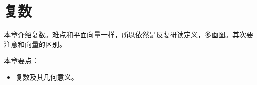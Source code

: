 \chapter{复数}

本章介绍复数。难点和平面向量一样，所以依然是反复研读定义，多画图。其次要注意和向量的区别。

本章要点：
\begin{itemize}
    \item 复数及其几何意义。
\end{itemize}

\newpage


\newpage


\newpage


\newpage






